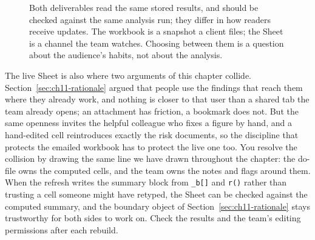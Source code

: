 \begin{figure}[htbp]
\centering
{}
\caption[Two delivery surfaces, one source]{Both deliverables read the same stored results, and should be checked against the same analysis run; they differ in how readers receive updates. The workbook is a snapshot a client files; the Sheet is a channel the team watches. Choosing between them is a question about the audience's habits, not about the analysis.}
\label{fig:ch11-viz-twopaths}
\end{figure}

The live Sheet is also where two arguments of this chapter collide. Section~\ref{sec:ch11-rationale} argued that people use the findings that reach them where they already work, and nothing is closer to that user than a shared tab the team already opens; an attachment has friction, a bookmark does not. But the same openness invites the helpful colleague who fixes a figure by hand, and a hand-edited cell reintroduces exactly the risk \textcite{panko1998errors} documents, so the discipline that protects the emailed workbook has to protect the live one too. You resolve the collision by drawing the same line we have drawn throughout the chapter: the do-file owns the computed cells, and the team owns the notes and flags around them. When the refresh writes the summary block from \texttt{\_b[]} and \texttt{r()} rather than trusting a cell someone might have retyped, the Sheet can be checked against the computed summary, and the boundary object of Section~\ref{sec:ch11-rationale} stays trustworthy for both sides to work on. Check the results and the team's editing permissions after each rebuild.

